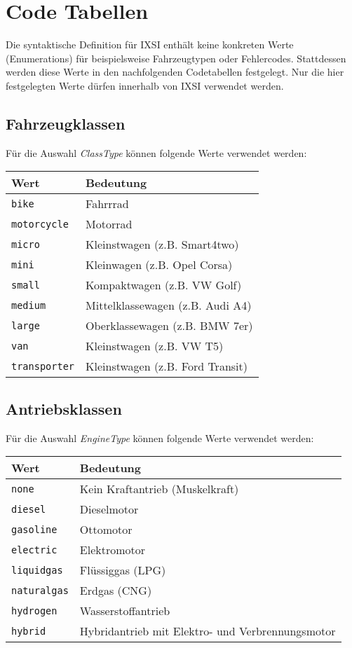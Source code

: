 \chapter{Code Tabellen}
\label{cha:CodeTabellen}
Die syntaktische Definition für IXSI enthält keine konkreten Werte (Enumerations) für beispielsweise Fahrzeugtypen oder Fehlercodes. Stattdessen werden diese Werte in den nachfolgenden Codetabellen festgelegt. Nur die hier festgelegten Werte dürfen innerhalb von IXSI verwendet werden.

\section{Fahrzeugklassen}
Für die Auswahl \emph{ClassType} können folgende Werte verwendet werden:

\begin{flushleft}
\begin{tabularx}{\linewidth}{l>{\raggedright\arraybackslash}X} 
\toprule
Wert & Bedeutung\\
\midrule
\verb|bike| & Fahrrrad\\
\verb|motorcycle| & Motorrad\\
\verb|micro| & Kleinstwagen (z.B. Smart4two)\\
\verb|mini| & Kleinwagen (z.B. Opel Corsa)\\
\verb|small| & Kompaktwagen (z.B. VW Golf)\\
\verb|medium| & Mittelklassewagen (z.B. Audi A4)\\
\verb|large| & Oberklassewagen (z.B. BMW 7er)\\
\verb|van| & Kleinstwagen (z.B. VW T5)\\
\verb|transporter| & Kleinstwagen (z.B. Ford Transit)\\
\bottomrule
\end{tabularx}
\end{flushleft}

\section{Antriebsklassen}
Für die Auswahl \emph{EngineType} können folgende Werte verwendet werden:

\begin{flushleft}
\begin{tabularx}{\linewidth}{l>{\raggedright\arraybackslash}X} 
\toprule
Wert & Bedeutung\\
\midrule
\verb|none| & Kein Kraftantrieb (Muskelkraft)\\
\verb|diesel| & Dieselmotor\\
\verb|gasoline| & Ottomotor\\
\verb|electric| & Elektromotor\\
\verb|liquidgas| & Flüssiggas (LPG)\\
\verb|naturalgas| & Erdgas (CNG)\\
\verb|hydrogen| & Wasserstoffantrieb\\
\verb|hybrid| & Hybridantrieb mit Elektro- und Verbrennungsmotor\\
\bottomrule
\end{tabularx}
\end{flushleft}

